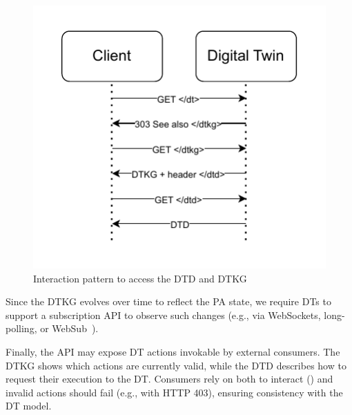 \begin{figure}[ht]
    \centering
     \includegraphics[width=0.7\columnwidth]{figures/hwodt/dtddtkg.pdf}
        \caption{Interaction pattern to access the \ac{DTD} and \ac{DTKG}}
        \label{fig:sequence-dtddtkg}
\end{figure}
  


Since the \ac{DTKG} evolves over time to reflect the \ac{PA} state, we require \acp{DT} to support a subscription \ac{API} to observe such changes (e.g., via WebSockets, long-polling, or WebSub~\cite{websub}).

Finally, the \ac{API} may expose \ac{DT} actions invokable by external consumers.
The \ac{DTKG} shows which actions are currently valid, while the \ac{DTD} describes how to request their execution to the \ac{DT}.
Consumers rely on both to interact () and invalid actions should fail (e.g., with HTTP 403), ensuring consistency with the \ac{DT} model.


